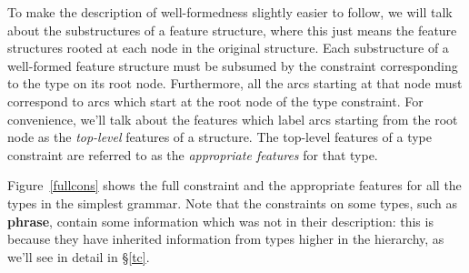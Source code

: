 \documentclass[12pt]{report}
\begin{document}
To make the description of well-formedness slightly easier to follow,
we will talk about the substructures of a feature structure,
where this just means the feature structures rooted at each node
in the original structure.  Each substructure of a well-formed
feature structure must be subsumed by the constraint corresponding
to the type on its root node.  Furthermore, all the
arcs starting at that node must correspond to arcs which start at the
root node of the type constraint.  For convenience, we'll talk about
the features which label arcs starting from the root node as
the {\it top-level} features of a structure.  The top-level features
of a type constraint are referred to as the {\it appropriate features}
for that type.

Figure~\ref{fullcons} shows the full constraint and the appropriate
features for all the types in the simplest grammar.  Note
that the constraints on some types, such as {\bf phrase}, contain
some information which was not in their description: this is
because they have inherited information from types higher in the
hierarchy, as we'll see in detail in \S\ref{tc}.
\end{document}
